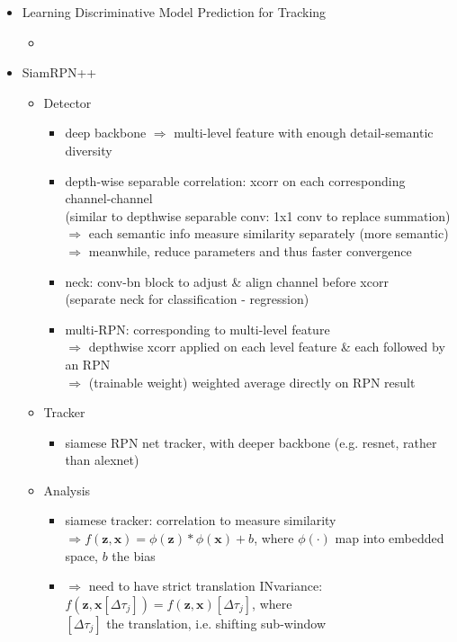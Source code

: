 \begin{itemize}
\item Learning Discriminative Model Prediction for Tracking
	\begin{itemize}
	\item 
	\end{itemize}

\item SiamRPN++
	\begin{itemize}
	\item Detector
		\begin{itemize}
		\item deep backbone $\Rightarrow$ multi-level feature with enough detail-semantic diversity
		\item depth-wise separable correlation: xcorr on each corresponding channel-channel \\
		(similar to depthwise separable conv: 1x1 conv to replace summation) \\
		$\Rightarrow$ each semantic info measure similarity separately (more semantic) \\
		$\Rightarrow$ meanwhile, reduce parameters and thus faster convergence
		\item neck: conv-bn block to adjust \& align channel before xcorr \\ 
		(separate neck for classification - regression)		
		\item multi-RPN: corresponding to multi-level feature \\
		$\Rightarrow$ depthwise xcorr applied on each level feature \& each followed by an RPN \\
		$\Rightarrow$ (trainable weight) weighted average directly on RPN result
		\end{itemize}
	\item Tracker
		\begin{itemize}
		\item siamese RPN net tracker, with deeper backbone (e.g. resnet, rather than alexnet)
		\end{itemize}
	\item Analysis
		\begin{itemize}
		\item siamese tracker: correlation to measure similarity \\
		$\Rightarrow f(\mathbf z, \mathbf x) = \phi(\mathbf z) * \phi(\mathbf x) + b$, where $\phi(\cdot)$ map into embedded space, $b$ the bias
		\item $\Rightarrow$ need to have strict translation INvariance: $f(\mathbf z, \mathbf x[\Delta\tau_j]) = f(\mathbf z, \mathbf x)[\Delta\tau_j]$, where \\ $[\Delta\tau_j]$ the translation, i.e. shifting sub-window \\

\end{itemize}
\end{itemize}
\end{itemize}
